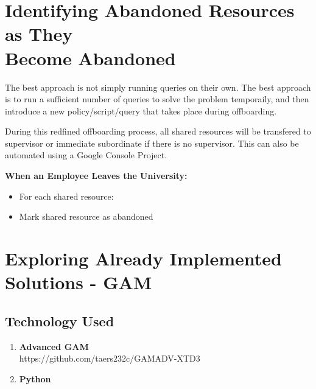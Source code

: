 \documentclass{article}
\begin{document}
\newpage
\section{Identifying Abandoned Resources as They\\ Become Abandoned}
The best approach is not simply running queries on their own. The best approach is to run a sufficient 
number of queries to solve the problem temporaily, and then introduce a new policy/script/query that takes place during offboarding.

During this redfined offboarding process, all shared resources will be transfered to supervisor or immediate subordinate if there is no supervisor.
This can also be automated using a Google Console Project.

\begin{tcolorbox}
    \textbf{When an Employee Leaves the University:}
    \begin{itemize}
        \item For each shared resource:
        \item Mark shared resource as abandoned
    \end{itemize}
\end{tcolorbox}
\newpage

\section{Exploring Already Implemented Solutions - GAM}
\subsection*{Technology Used}
\begin{tcolorbox}
    \begin{enumerate}
        \item \textbf{Advanced GAM}\\https://github.com/taers232c/GAMADV-XTD3
        \item \textbf{Python}
    \end{enumerate}
\end{tcolorbox}
\end{document}
